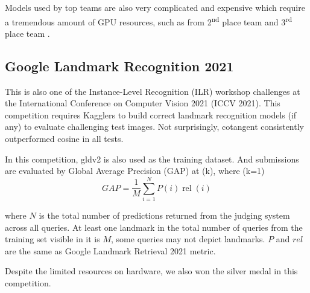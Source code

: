 Models used by top teams are also very complicated and expensive which require a tremendous amount of GPU resources, such as from 2\textsuperscript{nd} place team \cite{yuqi20212nd} and 3\textsuperscript{rd} place team \cite{ha2021google}.

\subsection{Google Landmark Recognition 2021} \label{s54}
This is also one of the Instance-Level Recognition (ILR) workshop challenges at the International Conference on Computer Vision 2021 (ICCV 2021). This competition requires Kagglers to build correct landmark recognition models (if any) to evaluate challenging test images. Not surprisingly, cotangent consistently outperformed cosine in all tests.

In this competition, gldv2 is also used \cite{weyand2020google} as the training dataset. And submissions are evaluated by Global Average Precision (GAP) at (k), where (k=1)
\begin{equation}
\label{equation09}
    GAP=\frac{1}{M} \sum_{i=1}^{N} P(i) \operatorname{rel}(i)
\end{equation}

where $N$ is the total number of predictions returned from the judging system across all queries. At least one landmark in the total number of queries from the training set visible in it is $M$, some queries may not depict landmarks. $P$ and $rel$ are the same as Google Landmark Retrieval 2021 metric.

Despite the limited resources on hardware, we also won the silver medal in this competition.

